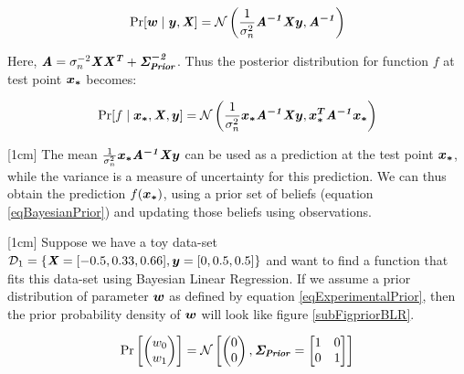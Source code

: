 \begin{equation}\label{eqBayesianPosterior}
\Pr[\boldsymbol{w} \mid \boldsymbol{y}, \bm{\mathit{X}}]  = \mathcal{N}\left ( \frac{1}{\sigma_{n}^{2}} \bm{\mathit{A^{-1}}}\bm{\mathit{X}}\boldsymbol{y} , \bm{\mathit{A^{-1}}} \right )
\end{equation}

Here, $\bm{\mathit{A}} = \sigma_{n}^{-2}\bm{\mathit{X}}\bm{\mathit{X^{T}}} + \bm{\mathit{\Sigma_{Prior}^{-2}}}$. Thus the posterior distribution for function $f$ at test point $\boldsymbol{x_{*}}$ becomes:

\begin{equation}\label{eqBayesianFunctionalPosterior}
\Pr[f \mid \boldsymbol{x_{*}}, \bm{\mathit{X}}, \boldsymbol{y}]  = \mathcal{N}\left ( \frac{1}{\sigma_{n}^{2}} \boldsymbol{x_{*}}\bm{\mathit{A^{-1}}}\bm{\mathit{X}}\boldsymbol{y} , \boldsymbol{x_{*}^T}\bm{\mathit{A^{-1}}}\boldsymbol{x_{*}} \right )
\end{equation}

[1cm]
The mean $\frac{1}{\sigma_{n}^{2}} \boldsymbol{x_{*}}\bm{\mathit{A^{-1}}}\bm{\mathit{X}}\boldsymbol{y}$ can be used as a prediction at the test point $\boldsymbol{x_{*}}$, while the variance is a measure of uncertainty for this prediction. We can thus obtain the prediction $f(\boldsymbol{x_{*}})$, using a prior set of beliefs (equation \ref{eqBayesianPrior}) and updating those beliefs using observations. 

\begin{mdframed}[hidealllines=true,backgroundcolor=lightgray!20]
[1cm]
Suppose we have a toy data-set $\mathcal{D}_{1} = \{\bm{\mathit{X}} = [-0.5, 0.33, 0.66], \boldsymbol{y} = [0, 0.5, 0.5]\}$ and want to find a function that fits this data-set using Bayesian Linear Regression. If we assume a prior distribution of parameter $\boldsymbol{w}$ as defined by equation \ref{eqExperimentalPrior}, then the prior probability density of $\boldsymbol{w}$ will look like figure \ref{subFigpriorBLR}.

\begin{equation}\label{eqExperimentalPrior}
\Pr \left [\begin{pmatrix}
w_{0}\\ 
w_{1}
\end{pmatrix} \right ] = \mathcal{N}\left [ \begin{pmatrix}
0\\ 
0
\end{pmatrix}, \bm{\mathit{\Sigma_{Prior}}} = \begin{bmatrix}
1 & 0\\ 
0 & 1
\end{bmatrix} \right ]
\end{equation}
\end{mdframed}

